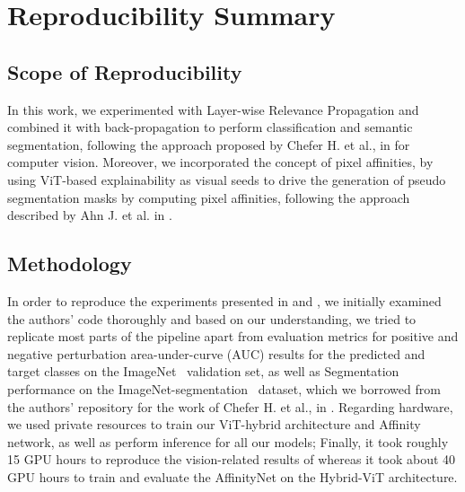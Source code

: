 \section{Reproducibility Summary}

\subsection{Scope of Reproducibility}
In this work, we experimented with Layer-wise Relevance Propagation and combined it with back-propagation to perform classification and semantic segmentation, following the approach proposed by Chefer H. et al., in \cite{mainpaper} for computer vision. Moreover, we incorporated the concept of pixel affinities, by using ViT-based explainability as visual seeds to drive the generation of pseudo segmentation masks by computing pixel affinities, following the approach described by Ahn J. et al. in \cite{ahn2018learning}.

\subsection{Methodology}
In order to reproduce the experiments presented in \cite{mainpaper} and \cite{ahn2018learning}, we initially examined the authors' code thoroughly and based on our understanding, we tried to replicate most parts of the pipeline apart from evaluation metrics for positive and negative perturbation area-under-curve (AUC) results for the predicted and target classes on the ImageNet~\cite{russakovsky2015ImageNet} validation set, as well as Segmentation performance on the ImageNet-segmentation~\cite{imagenet-seg} dataset, which we borrowed from the authors' repository for the work of Chefer H. et al., in \cite{mainpaper}. Regarding hardware, we used private resources to train our ViT-hybrid architecture and Affinity network, as well as perform inference for all our models; Finally, it took roughly 15 GPU hours to reproduce the vision-related results of \cite{mainpaper} whereas it took about 40 GPU hours to train and evaluate the AffinityNet on the Hybrid-ViT architecture.


